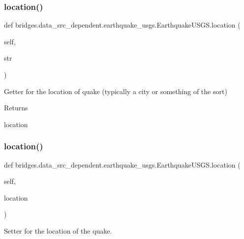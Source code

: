 \subsubsection{\texorpdfstring{location()}{location()}\hspace{0.1cm}{\footnotesize\ttfamily [1/2]}}
{\footnotesize\ttfamily def bridges.\+data\+\_\+src\+\_\+dependent.\+earthquake\+\_\+usgs.\+Earthquake\+U\+S\+G\+S.\+location (\begin{DoxyParamCaption}\item[{}]{self,  }\item[{}]{str }\end{DoxyParamCaption})}



Getter for the location of quake (typically a city or something of the sort) 

\begin{DoxyReturn}{Returns}


location 
\end{DoxyReturn}
\mbox{\label{classbridges_1_1data__src__dependent_1_1earthquake__usgs_1_1_earthquake_u_s_g_s_a3004af322cb3d2179f17ce0210571c22}} 
\subsubsection{\texorpdfstring{location()}{location()}\hspace{0.1cm}{\footnotesize\ttfamily [2/2]}}
{\footnotesize\ttfamily def bridges.\+data\+\_\+src\+\_\+dependent.\+earthquake\+\_\+usgs.\+Earthquake\+U\+S\+G\+S.\+location (\begin{DoxyParamCaption}\item[{}]{self,  }\item[{}]{location }\end{DoxyParamCaption})}



Setter for the location of the quake. 


